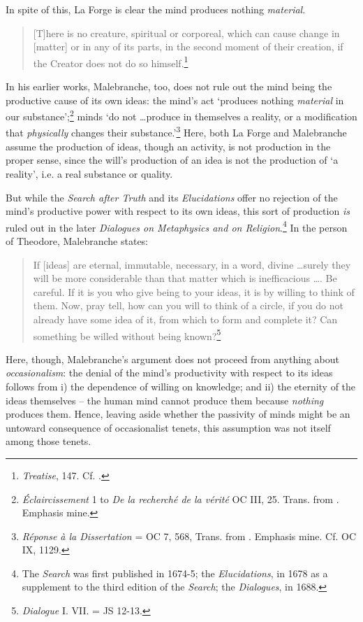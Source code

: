 \documentclass[]{article}
\begin{document}
In spite of this, La Forge is clear the mind produces nothing \emph{material}.

\begin{quote}
	{[}T{]}here is no creature, spiritual or corporeal, which can cause change in {[}matter{]} or in any of its parts, in the second moment of their creation, if the Creator does not do so himself.\footnote{\emph{Treatise}, 147. Cf. \autocite{Klima1993}.}
\end{quote}

In his earlier works, Malebranche, too, does not rule out the mind being the productive cause of its own ideas: the mind's act `produces nothing \emph{material} in our substance';\footnote{\emph{Éclaircissement} 1 to \emph{De la recherché de la vérité} OC III, 25. Trans. from \autocite[52]{Nadler2005}. Emphasis mine.} minds `do not \ldots produce in themselves a reality, or a modification that \emph{physically} changes their substance.'\footnote{\emph{Réponse à la Dissertation} = OC 7, 568, Trans. from \autocite[52]{Nadler2005}. Emphasis mine. Cf. OC IX, 1129.} Here, both La Forge and Malebranche assume the production of ideas, though an activity, is not production in the proper sense, since the will's production of an idea is not the production of `a reality', i.e. a real substance or quality.

But while the \emph{Search after Truth} and its \emph{Elucidations} offer no rejection of the mind's productive power with respect to its own ideas, this sort of production \emph{is} ruled out in the later \emph{Dialogues on Metaphysics and on Religion}.\footnote{The \emph{Search} was first published in 1674-5; the \emph{Elucidations}, in 1678 as a supplement to the third edition of the \emph{Search}; the \emph{Dialogues}, in 1688.} In the person of Theodore, Malebranche states:

\begin{quote}
	If [ideas] are eternal, immutable, necessary, in a word, divine \ldots surely they will be more considerable than that matter which is inefficacious \ldots. Be careful. If it is you who give being to your ideas, it is by willing to think of them. Now, pray tell, how can you will to think of a circle, if you do not already have some idea of it, from which to form and complete it? Can something be willed without being known?\footnote{\emph{Dialogue} I. VII. = JS 12-13.}
\end{quote}

Here, though, Malebranche's argument does not proceed from anything about \emph{occasionalism}: the denial of the mind's productivity with respect to its ideas follows from i) the dependence of willing on knowledge; and ii) the eternity of the ideas themselves -- the human mind cannot produce them because \emph{nothing} produces them. Hence, leaving aside whether the passivity of minds might be an untoward consequence of occasionalist tenets, this assumption was not itself among those tenets.
\end{document}
